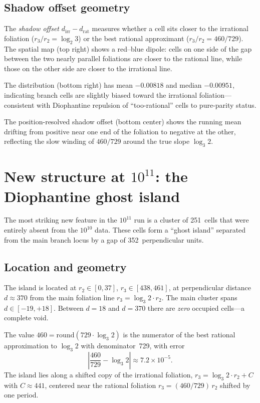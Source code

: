 \documentclass[11pt]{article}
\begin{document}
\subsection{Shadow offset geometry}

The \emph{shadow offset} $d_{\mathrm{irr}} - d_{\mathrm{rat}}$
measures whether a cell sits closer to the irrational foliation
($r_3/r_2 = \log_2 3$) or the best rational approximant
($r_3/r_2 = 460/729$).  The spatial map (top right) shows a
red--blue dipole: cells on one side of the gap between the two
nearly parallel foliations are closer to the rational line, while
those on the other side are closer to the irrational line.

The distribution (bottom right) has mean $-0.00818$ and median
$-0.00951$, indicating branch cells are slightly biased toward
the irrational foliation---consistent with Diophantine repulsion
of ``too-rational'' cells to pure-parity status.

The position-resolved shadow offset (bottom center) shows the
running mean drifting from positive near one end of the foliation
to negative at the other, reflecting the slow winding of $460/729$
around the true slope $\log_3 2$.

\section{New structure at $10^{11}$: the Diophantine ghost island}
\label{sec:ghost}

The most striking new feature in the $10^{11}$ run is a cluster
of 251~cells that were entirely absent from the $10^{10}$ data.
These cells form a ``ghost island'' separated from the main branch
locus by a gap of 352~perpendicular units.

\subsection{Location and geometry}

The island is located at $r_2 \in [0, 37]$, $r_3 \in [438, 461]$,
at perpendicular distance $d \approx 370$ from the main foliation
line $r_3 = \log_3 2 \cdot r_2$.  The main cluster spans
$d \in [-19, +18]$.  Between $d = 18$ and $d = 370$ there are
\emph{zero} occupied cells---a complete void.

The value $460 = \mathrm{round}(729 \cdot \log_3 2)$ is the
numerator of the best rational approximation to $\log_3 2$ with
denominator~729, with error
\[
  \left|\frac{460}{729} - \log_3 2\right| \approx 7.2 \times 10^{-5}.
\]
The island lies along a shifted copy of the irrational foliation,
$r_3 = \log_3 2 \cdot r_2 + C$ with $C \approx 441$, centered
near the rational foliation $r_3 = (460/729)\, r_2$ shifted by
one period.
\end{document}

